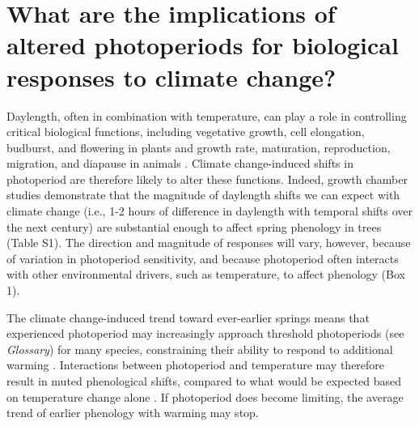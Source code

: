 \documentclass{article}
\begin{document}
\section*{What are the implications of altered photoperiods for biological responses to climate change?}
\par Daylength, often in combination with temperature, can play a role in controlling critical biological functions, including vegetative growth, cell elongation, budburst, and flowering in plants \citep{fu2019,Heide:2012aa,Heide:2011aa,Hsu:2011,sidaway2010,mimura2007,Linkosalo:2006aa,erwin1998,Ashby:1962aa} and growth rate, maturation, reproduction, migration, and diapause in animals \citep{dunn2019,winkler2014,zydlewski2014,dardente2012,tobin2008,bradshaw2006,ben1997,muir1994,saunders1970,dawbin1966}. Climate change-induced shifts in photoperiod are therefore likely to alter these functions. 
Indeed, growth chamber studies demonstrate that the magnitude of daylength shifts we can expect with climate change (i.e., 1-2 hours of difference in daylength with temporal shifts over the next century) are substantial enough to affect spring phenology in trees (Table S1). The direction and magnitude of responses will vary, however, because of variation in photoperiod sensitivity, and because photoperiod often interacts with other environmental drivers, such as temperature, to affect phenology (Box 1). 
\par The climate change-induced trend toward ever-earlier springs means that experienced photoperiod may increasingly approach threshold photoperiods (see \emph{Glossary}) for many species, constraining their ability to respond to additional warming \citep{fu2019,vitasse2013,koerner2010a,Morin:2010aa,Nienstaedt:1966aa}. Interactions between photoperiod and temperature may therefore result in muted phenological shifts, compared to what would be expected based on temperature change alone \citep{koerner2010a,mimura2007,wareing1956}. If photoperiod does become limiting, the average trend of earlier phenology with warming \citep{ovaskainen2013,polgar2013,penuelas2002,menzel2000} may stop.


\end{document}
